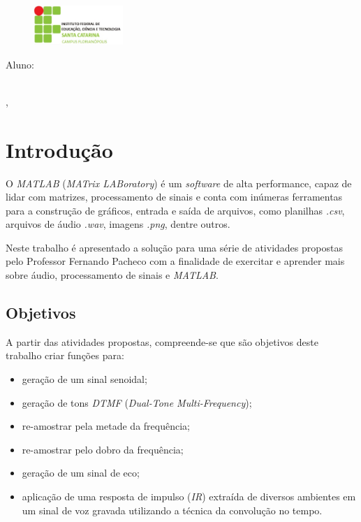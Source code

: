 \documentclass[
	12pt,				%
	article,			%
	openright,			%
	oneside,
	a4paper,			%
	chapter=TITLE,		%
	section=TITLE,		%
	english,			%
	french,				%
	spanish,			%
	brazil,				%
]{abntex2}
\renewcommand{\imprimircapa}{
	\begin{capa}
		\SingleSpacing
		\begin{adjustwidth}{}{}			
			\begin{minipage}{1\textwidth}
				\begin{figure}
					\vspace*{-1em}\includegraphics[height=4em]{logotipo_ifsc.jpg}
				\end{figure}
				\imprimirinstituicao 
			\end{minipage}
			\vfill
			\begin{center}\ABNTEXchapterfont\LARGE\imprimirtitulo
				\vfill
				\small
				\begin{center}
					Aluno: \imprimirautor\\[1em]
					\imprimirorientadorRotulo\imprimirorientador\\
					\imprimircoorientadorRotulo\imprimircoorientador
				\end{center}
				\vfill
				\imprimirlocal, \imprimirdata
			\end{center}	
		\end{adjustwidth}
	\end{capa}
}
\begin{document}
	
	
	\frenchspacing 
	
	
	\imprimircapa
	
	\tableofcontents*
	
	
	\textual
	
	\pagebreak
	
	\chapter*[Introdução]{Introdução}
	
	O \textit{MATLAB} (\textit{MATrix LABoratory}) é um \textit{software} de alta performance, capaz de lidar com matrizes, processamento de sinais e conta com inúmeras ferramentas para a construção de gráficos, entrada e saída de arquivos, como planilhas \textit{.csv}, arquivos de áudio \textit{.wav}, imagens \textit{.png}, dentre outros.
	
	Neste trabalho é apresentado a solução para uma série de atividades propostas pelo Professor Fernando Pacheco com a finalidade de exercitar e aprender mais sobre áudio, processamento de sinais e \textit{MATLAB}.
	
	\section[Objetivos]{Objetivos}
	
	A partir das atividades propostas, compreende-se que são objetivos deste trabalho criar funções para:
	
	\begin{itemize}
		\item geração de um sinal senoidal;
		\item geração de tons \textit{DTMF} (\textit{Dual-Tone Multi-Frequency});
		\item re-amostrar pela metade da frequência;
		\item re-amostrar pelo dobro da frequência;
		\item geração de um sinal de eco;
		\item aplicação de uma resposta de impulso (\textit{IR}) extraída de diversos ambientes em um sinal de voz gravada utilizando a técnica da convolução no tempo.
	\end{itemize}
	
\end{document}
